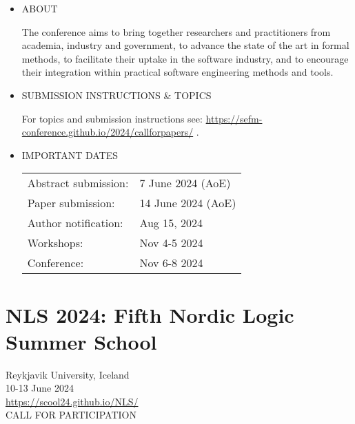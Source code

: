 \documentclass[prodmode,acmtecs]{acmsmall} %
\begin{document}
\begin{itemize}\item  ABOUT  
 
  The conference aims to bring together researchers and practitioners from academia, industry and government, to advance the state of the art in formal methods, to facilitate their uptake in the software industry, and to encourage their integration within practical software engineering methods and tools. 
 
\item  SUBMISSION INSTRUCTIONS \& TOPICS   
 
  For topics and submission instructions see: \href{https://sefm-conference.github.io/2024/callforpapers/}{https://sefm-conference.github.io/2024/callforpapers/} . 
 
\item  IMPORTANT DATES  
 
\begin{tabulary}{\linewidth}{LL}Abstract submission:  & 7 June 2024 (AoE) \\
Paper submission:  & 14 June 2024 (AoE) \\
Author notification:  & Aug 15, 2024 \\
Workshops:  & Nov 4-5 2024 \\
Conference:  & Nov 6-8 2024 \\
\end{tabulary}
 
\end{itemize}\section{NLS 2024: Fifth Nordic Logic Summer School }\label{NLS2024}  Reykjavik University, Iceland\\ 
  10-13 June 2024\\ 
  \href{https://scool24.github.io/NLS/}{https://scool24.github.io/NLS/}\\ 
CALL FOR PARTICIPATION 
\end{document}
